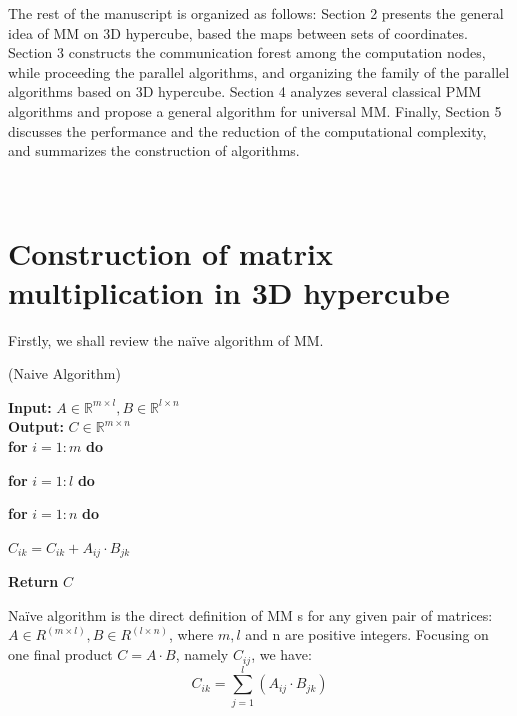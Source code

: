 \documentclass{amsart}
\theoremstyle{definition}
\theoremstyle{remark}
\numberwithin{equation}{section}
\begin{document}
	The rest of the manuscript is organized as follows: Section 2 presents the general idea of MM  on 3D hypercube, based the maps between sets of coordinates. Section 3  constructs the communication forest among the computation nodes, while proceeding the parallel algorithms, and organizing the family of the parallel algorithms based on 3D hypercube. Section 4 analyzes several classical PMM algorithms and propose a general algorithm for universal MM. Finally, Section 5 discusses the performance and the reduction of the computational complexity, and summarizes the construction of algorithms.\par
~\\
\section{Construction of matrix multiplication in 3D hypercube}
Firstly, we shall review the naïve algorithm of MM.\par

\begin{algorithm}[t] 
\caption{(Naive Algorithm)}
\begin{adjustwidth}{0cm}{1cm} 
\textbf{Input:} $A\in \mathbb{R}^{m\times l},B\in \mathbb{R}^{l\times n}$\\
\textbf{Output:} $C\in \mathbb{R}^{m\times n}$\\
\textbf{for} $i=1:m $\textbf{ do}\\
\end{adjustwidth}
	\begin{adjustwidth}{1cm}{1cm}
	\textbf{for} $i=1:l $\textbf{ do}\\
	\end{adjustwidth}
		\begin{adjustwidth}{2cm}{1cm}
		\textbf{for} $i=1:n $\textbf{ do}\\
		\end{adjustwidth}
			\begin{adjustwidth}{3cm}{1cm}
			$C_{ik}=C_{ik}+A_{ij}\cdot B_{jk}$\\
			\end{adjustwidth}
\begin{adjustwidth}{0cm}{1cm} 
\textbf{Return } $C$\\
\end{adjustwidth}
\end{algorithm}

Naïve algorithm is the direct definition of MM s for any given pair of matrices: $A\in R^{(m\times l)},B\in R^{(l\times n)}$, where $m,l$ and n are positive integers. Focusing on one final product $C=A\cdot B$, namely $C_{ij}$, we have:
\begin{equation}
C_{ik}=\sum_{j=1}^{l}(A_{ij}\cdot B_{jk})
\end{equation}
\end{document}
